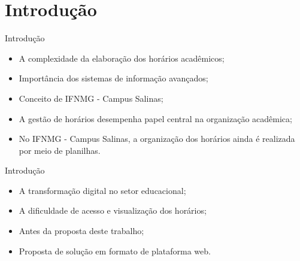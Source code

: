 \section{Introdução}

\begin{frame}{Introdução}
	\begin{itemize}
		\item A complexidade da elaboração dos horários acadêmicos; \vspace{0.5cm}
		\item Importância dos sistemas de informação avançados; \vspace{0.5cm}
		\item Conceito de IFNMG - Campus Salinas; \vspace{0.5cm}
		\item A gestão de horários desempenha papel central na organização acadêmica; \vspace{0.5cm}
		\item No IFNMG - Campus Salinas, a organização dos horários ainda é realizada por meio de planilhas. \vspace{0.5cm}
	\end{itemize}
\end{frame}

\begin{frame}{Introdução}
	\begin{itemize}
		\item A transformação digital no setor educacional; \vspace{0.5cm}
		\item A dificuldade de acesso e visualização dos horários; \vspace{0.5cm}
		\item Antes da proposta deste trabalho; \vspace{0.5cm}
		\item Proposta de solução em formato de plataforma web. \vspace{0.5cm}
	\end{itemize}
\end{frame}